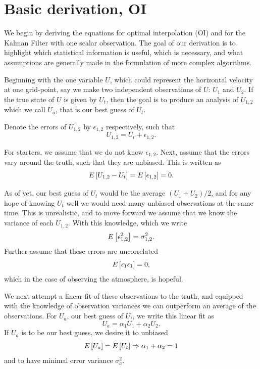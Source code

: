 \section{Basic derivation, OI}

We begin by deriving the equations for optimal interpolation (OI) and for the Kalman Filter with one scalar observation.
The goal of our derivation is to highlight which statistical information is useful, which is necessary, and what assumptions are generally made in the formulation of more complex algorithms.

Beginning with the one variable $U$, which could represent the horizontal velocity at one grid-point, say we make two independent observations of $U$: $U_1$ and $U_2$.
If the true state of $U$ is given by $U_t$, then the goal is to produce an analysis of $U_{1,2}$ which we call $U_a$, that is our best guess of $U_t$.

Denote the errors of $U_{1,2}$ by $\epsilon _{1,2}$ respectively, such that
$$ U_{1,2} = U_t + \epsilon _{1,2} .$$

For starters, we assume that we do not know $\epsilon _{1,2}$.
Next, assume that the errors vary around the truth, such that they are unbiased.
This is written as
\begin{equation*} E \left [ U_{1,2}-U_t \right ] = E \left [ \epsilon _{1,2}  \right ] = 0. \end{equation*}

As of yet, our best guess of $U_t$ would be the average $(U_1 + U_2)/2$, and for any hope of knowing $U_t$ well we would need many unbiased observations at the same time.
This is unrealistic, and to move forward we assume that we know the variance of each $U_{1,2}$.
With this knowledge, which we write
\begin{equation} E \left [ \epsilon _{1,2} ^2 \right ] = \sigma _{1,2} ^2 .\end{equation}
Further assume that these errors are uncorrelated
\begin{equation} E \left [ \epsilon _1 \epsilon _1 \right ] = 0, \end{equation}
which in the case of observing the atmosphere, is hopeful.

We next attempt a linear fit of these observations to the truth, and equipped with the knowledge of observation variances we can outperform an average of the observations.
For $U_a$, our best guess of $U_t$, we write this linear fit as
\begin{equation} U_a = \alpha _1 U_1 + \alpha _2 U_2 \label{eq:analproblem}. \end{equation}
If $U_a$ is to be our best guess, we desire it to unbiased
\begin{equation*} E \left [ U_a \right ] = E \left [ U_t \right ] \Rightarrow \alpha _1 + \alpha _2 = 1\end{equation*}
and to have minimal error variance $\sigma _a ^2$.

